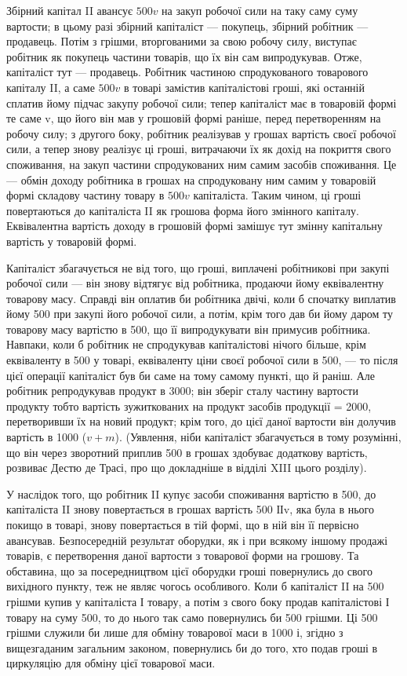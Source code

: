 Збірний капітал II авансує $500v$ на закуп робочої сили на таку саму
суму вартости; в цьому разі збірний капіталіст — покупець, збірний
робітник — продавець. Потім з грішми, вторгованими за свою робочу силу,
виступає робітник як покупець частини товарів, що їх він сам випродукував.
Отже, капіталіст тут — продавець. Робітник частиною спродукованого
товарового капіталу II, а саме $500v$ в товарі замістив капіталістові
гроші, які останній сплатив йому підчас закупу робочої сили; тепер
капіталіст має в товаровій формі те саме v, що його він мав у грошовій
формі раніше, перед перетворенням на робочу силу; з другого боку,
робітник реалізував у грошах вартість своєї робочої сили, а тепер знову
реалізує ці гроші, витрачаючи їх як дохід на покриття свого споживання,
на закуп частини спродукованих ним самим засобів споживання. Це —
обмін доходу робітника в грошах на спродуковану ним самим у товаровій
формі складову частину товару в $500v$ капіталіста. Таким чином,
ці гроші повертаються до капіталіста II як грошова форма його змінного
капіталу. Еквівалентна вартість доходу в грошовій формі замішує тут
змінну капітальну вартість у товаровій формі.

Капіталіст збагачується не від того, що гроші, виплачені робітникові
при закупі робочої сили — він знову відтягує від робітника, продаючи йому
еквівалентну товарову масу. Справді він оплатив би робітника двічі, коли
б спочатку виплатив йому 500 при закупі його робочої сили, а потім,
крім того дав би йому даром ту товарову масу вартістю в 500, що її
випродукувати він примусив робітника. Навпаки, коли б робітник не
спродукував капіталістові нічого більше, крім еквіваленту в 500 у товарі,
еквіваленту ціни своєї робочої сили в 500, — то після цієї операції капіталіст
був би саме на тому самому пункті, що й раніш. Але робітник
репродукував продукт в 3000; він зберіг сталу частину вартости
продукту тобто вартість зужиткованих на продукт засобів продукції = 2000,
перетворивши їх на новий продукт; крім того, до цієї даної
вартости він долучив вартість в 1000 ($v + m$). (Уявлення, ніби капіталіст
збагачується в тому розумінні, що він через зворотний приплив
500 в грошах здобуває додаткову вартість, розвиває Дестю де Трасі, про
що докладніше в відділі XIII цього розділу).

У наслідок того, що робітник II купує засоби споживання вартістю
в 500, до капіталіста II знову повертається в грошах вартість 500 ІІv,
яка була в нього покищо в товарі, знову повертається в тій формі, що
в ній він її первісно авансував. Безпосередній результат оборудки, як і
при всякому іншому продажі товарів, є перетворення даної вартости з
товарової форми на грошову. Та обставина, що за посередництвом цієї
оборудки гроші повернулись до свого вихідного пункту, теж не являє
чогось особливого. Коли б капіталіст II на 500 грішми купив у капіталіста
І товару, а потім з свого боку продав капіталістові І товару на
суму 500, то до нього так само повернулись би 500 грішми. Ці 500 грішми
служили би лише для обміну товарової маси в 1000 і, згідно з вищезгаданим
загальним законом, повернулись би до того, хто подав гроші в
циркуляцію для обміну цієї товарової маси.
